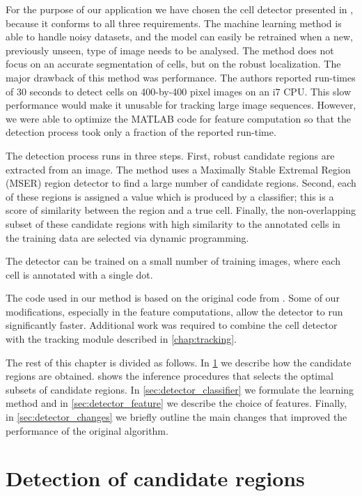 	For the purpose of our application we have chosen the cell detector presented in \cite{arteta12}, because it conforms to all three requirements. The machine learning method is able to handle noisy datasets, and the model can easily be retrained when a new, previously unseen, type of image needs to be analysed. The method does not focus on an accurate segmentation of cells, but on the robust localization. The major drawback of this method was performance. The authors reported run-times of 30 seconds to detect cells on 400-by-400 pixel images on an i7 CPU. This slow performance would make it unusable for tracking large image sequences. However, we were able to optimize the MATLAB code for feature computation so that the detection process took only a fraction of the reported run-time.
	
	The detection process runs in three steps. First, robust candidate regions are extracted from an image. The method uses a Maximally Stable Extremal Region (MSER) region detector \cite{matas04} to find a large number of candidate regions. Second, each of these regions is assigned a value which is produced by a classifier; this is a score of similarity between the region and a true cell. Finally, the non-overlapping subset of these candidate regions with high similarity to the annotated cells in the training data are selected via dynamic programming.
	
	The detector can be trained on a small number of training images, where each cell is  annotated with a single dot. 

	The code used in our method is based on the original code from \cite{arteta12}. Some of our modifications, especially in the feature computations, allow the detector to run significantly faster. Additional work was required to combine the cell detector with the tracking module described in \cref{chap:tracking}.
	
	The rest of this chapter is divided as follows. In \cref{sec:detector_extremal} we describe how the candidate regions are obtained.  shows the inference procedures that selects the optimal subsets of candidate regions. In \cref{sec:detector_classifier} we formulate the learning method and in \cref{sec:detector_feature} we describe the choice of features. Finally, in \cref{sec:detector_changes} we briefly outline the main changes that improved the performance of the original algorithm.
	
	\section{Detection of candidate regions \statusfirstdraft}
	\label{sec:detector_extremal}
	
